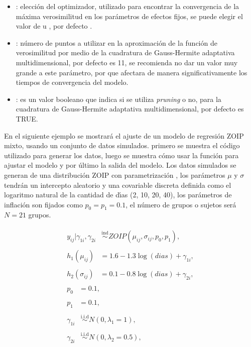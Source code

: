 \begin{itemize}[noitemsep, nolistsep]
\item {}: elecci\'{o}n del optimizador, utilizado para encontrar la convergencia de la m\'{a}xima verosimilitud en los par\'{a}metros de efectos fijos, se puede elegir el valor de  u , por defecto .
\item {}: n\'{u}mero de puntos a utilizar en la aproximaci\'{o}n de la funci\'{o}n de ve\-ro\-si\-mi\-li\-tud por medio de la cuadratura de Gauss-Hermite adaptativa multidimensional, por defecto es 11, se recomienda no dar un valor muy grande a este par\'{a}metro, por que afectara de manera significativamente los tiempos de convergencia del modelo.
\item {}: es un valor booleano que indica si se utiliza \textit{pruning} o no, para la cuadratura de Gauss-Hermite adaptativa multidimensional, por defecto es TRUE.

\end{itemize}

En el siguiente ejemplo se mostrar\'{a} el ajuste de un modelo de regresi\'{o}n ZOIP mixto, usando un conjunto de datos simulados. primero se muestra el c\'{o}digo utilizado para generar los datos, luego se muestra c\'{o}mo usar la funci\'{o}n  para ajustar el modelo y por \'{u}ltimo la salida del modelo. Los datos simulados se generan de una distribuci\'{o}n ZOIP con parametrizaci\'{o}n \cite{Stasinopoulos2}, los par\'{a}metros $\mu$ y $\sigma$ tendr\'{a}n un intercepto aleatorio y una covariable discreta definida como el logaritmo natural de la cantidad de d\'{\i}as (2, 10, 20, 40), los par\'{a}metros de inflaci\'{o}n son fijados como $p_0=p_1=0.1$, el n\'{u}mero de grupos o sujetos ser\'{a} $N=21$ grupos.


\begin{align*}
\begin{split}
y_{ij}| \gamma_{1i},\gamma_{2i} & \overset{\text{ind}}{\sim} ZOIP(\mu_{ij},\sigma_{ij},p_{0}, p_{1}),
\end{split}\\
\begin{split}
	h_1(\mu_{ij}) &= 1.6-1.3 \log(dias) + \gamma_{1i},
\end{split}\\
\begin{split}
	h_2(\sigma_{ij}) &= 0.1-0.8\log(dias) + \gamma_{2i},
\end{split}\\
\begin{split}
	p_{0} &= 0.1,
\end{split}\\
\begin{split}
	p_{1} &= 0.1,
\end{split}\\
\begin{split}
	\gamma_{1i} & \overset{\text{i.i.d}}{\sim}  N(0,\lambda_1=1),
\end{split}\\
\begin{split}
	\gamma_{2i} & \overset{\text{i.i.d}}{\sim}  N(0,\lambda_2=0.5),
\end{split}
\end{align*}

